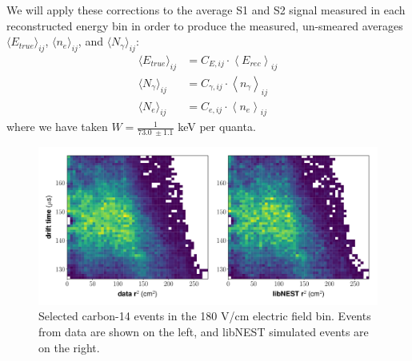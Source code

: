 We will apply these corrections to the average S1 and S2 signal measured in each reconstructed energy bin in order to produce the measured, un-smeared averages $\langle E_{true} \rangle_{ij}$, $\langle n_{e} \rangle_{ij}$, and $\langle N_{\gamma} \rangle_{ij}$:
\begin{align}
\label{eq:datEtrue}\langle E_{true} \rangle_{ij}&=C_{E,ij} \cdot \left\langle E_{rec} \right\rangle_{ij} \\[1em]
\label{eq:datNytrue}\langle N_{\gamma} \rangle_{ij}&=C_{\gamma,ij} \cdot \left\langle n_{\gamma}\right\rangle_{ij} \\[1em]
\label{eq:datNetrue}\langle N_{e} \rangle_{ij}&= C_{e,ij} \cdot \left\langle n_e\right\rangle_{ij}
\end{align}
where we have taken $W=\frac{1}{73.0 \ \pm 1.1}$ keV per quanta. 
\begin{figure}[h!]
\centering
\includegraphics[width=\textwidth]{Figures/yields_corrections/C14_eFcut_gfdcm_180Vcm_prelim.pdf}
\caption{Selected carbon-14 events in the 180 V/cm electric field bin. Events from data are shown on the left, and libNEST simulated events are on the right. }
\label{fig:efcut_180vcm}
\end{figure}


